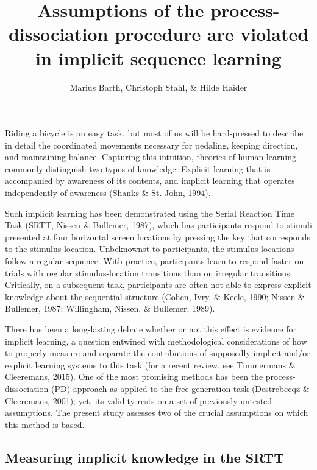 \documentclass[man]{apa6}
\title{Assumptions of the process-dissociation procedure are violated in
implicit sequence learning}
\author{Marius Barth\textsuperscript{}, Christoph Stahl\textsuperscript{}, \& Hilde Haider\textsuperscript{}}
\affiliation{
    \vspace{0.5cm}
          \textsuperscript{} University of Cologne  }
\theoremstyle{definition}
\theoremstyle{definition}
\theoremstyle{definition}
\theoremstyle{remark}
\begin{document}
\maketitle

\setcounter{secnumdepth}{0}



Riding a bicycle is an easy task, but most of us will be hard-pressed to
describe in detail the coordinated movements necessary for pedaling,
keeping direction, and maintaining balance. Capturing this intuition,
theories of human learning commonly distinguish two types of knowledge:
Explicit learning that is accompanied by awareness of its contents, and
implicit learning that operates independently of awareness (Shanks \&
St. John, 1994).

Such implicit learning has been demonstrated using the Serial Reaction
Time Task (SRTT, Nissen \& Bullemer, 1987), which has participants
respond to stimuli presented at four horizontal screen locations by
pressing the key that corresponds to the stimulus location. Unbeknownst
to participants, the stimulus locations follow a regular sequence. With
practice, participants learn to respond faster on trials with regular
stimulus-location transitions than on irregular transitions. Critically,
on a subsequent task, participants are often not able to express
explicit knowledge about the sequential structure (Cohen, Ivry, \&
Keele, 1990; Nissen \& Bullemer, 1987; Willingham, Nissen, \& Bullemer,
1989).

There has been a long-lasting debate whether or not this effect is
evidence for implicit learning, a question entwined with methodological
considerations of how to properly measure and separate the contributions
of supposedly implicit and/or explicit learning systems to this task
(for a recent review, see Timmermans \& Cleeremans, 2015). One of the
most promising methods has been the process-dissociation (PD) approach
as applied to the free generation task (Destrebecqz \& Cleeremans,
2001); yet, its validity rests on a set of previously untested
assumptions. The present study assesses two of the crucial assumptions
on which this method is based.

\subsection{Measuring implicit knowledge in the
SRTT}\label{measuring-implicit-knowledge-in-the-srtt}
\end{document}
